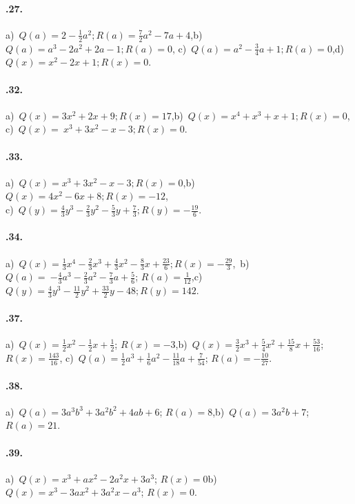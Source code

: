 \paragraph{\thechapter.27.}
a)~$Q(a)=2-\frac{1}{2}a^{2}; R(a)=\frac{7}{2}a^{2}-7a+4$,\quad b)~$Q(a)=a^{3}-2a^{2}+2a-1; R(a)=0$,\quad
c)~$Q(a)=a^{2}-\frac{3}{4}a+1; R(a)=0$,\quad d)~$Q(x)=x^{2}-2x+1; R(x)=0$.
\paragraph{\thechapter.32.}
a)~$Q(x)=3x^{2}+2x+9; R(x)=17$,\quad b)~$Q(x)=x^{4}+x^{3}+x+1; R(x)=0$, \protect\\ c)~$Q(x)=~x^{3}+3x^{2}-x-3; R(x)=0$.
\paragraph{\thechapter.33.}
a)~$Q(x)=x^{3}+3x^{2}-x-3; R(x)=0$,\quad b)~$Q(x)=4x^{2}-6x+8; R(x)=-12$,\protect\\ c)~$Q(y)=\frac{4}{3}y^{3}-\frac{2}{3}y^{2}-\frac{5}{3}y+\frac{7}{3}; R(y)=-\frac{19}{6}$.
\paragraph{\thechapter.34.}
a)~$Q(x)=\frac{1}{3}x^{4}-\frac{2}{3}x^{3}+\frac{4}{3}x^{2}-\frac{8}{3}x+\frac{23}{6}; R(x)=-\frac{29}{3}$,
\,b)~$Q(a)=~{-\frac{4}{3}a^{3}-\frac{2}{3}a^{2}-\frac{7}{3}a+\frac{5}{6}}$; $R(a)=\frac{1}{12}$,\quad c)~$Q(y)=\frac{4}{3}y^{3}-\frac{11}{2}y^{2}+\frac{33}{2}y-48; R(y)=142$.
\paragraph{\thechapter.37.}
a)~$Q(x)=\frac{1}{2}x^{2}-\frac{1}{2}x+\frac{1}{2}$; $R(x)=-3$,\quad b)~$Q(x)=\frac{3}{2}x^{3}+\frac{5}{4}x^{2}+\frac{15}{8}x+\frac{53}{16}$; $R(x)=\frac{143}{16}$,
\quad c)~$Q(a)=\frac{1}{2}a^{3}+\frac{1}{6}a^{2}-\frac{11}{18}a+\frac{7}{54}$; $R(a)=-{\frac{10}{27}}$.
\paragraph{\thechapter.38.}
a)~$Q(a)=3a^{3}b^{3}+3a^{2}b^{2}+4ab+6$; $R(a)=8$,\quad b)~$Q(a)=3a^{2}b+7$; $R(a)=21$.
\paragraph{\thechapter.39.}
a)~$Q(x)=x^{3}+ax^{2}-2a^{2}x+3a^{3}$; $R(x)=0$\quad b)~$Q(x)=x^3-3ax^2+3a^2 x-a^3$; $R(x)=0$.
